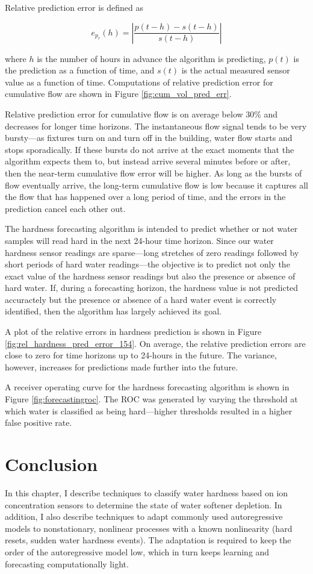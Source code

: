 Relative prediction error is defined as

\begin{equation*}
e_{p_r}(h) = \left| \frac{p(t-h)-s(t-h)}{s(t-h)} \right|
\end{equation*}

where $h$ is the number of hours in advance the algorithm is predicting, $p(t)$ is the prediction as a function of time, and $s(t)$ is the actual measured sensor value as a function of time.
 Computations of relative prediction error for cumulative flow are shown in Figure \ref{fig:cum_vol_pred_err}.

Relative prediction error for cumulative flow is on average below 30\% and decreases for longer time horizons.
 The instantaneous flow signal tends to be very bursty---as fixtures turn on and turn off in the building, water flow starts and stops sporadically.
 If these bursts do not arrive at the exact moments that the algorithm expects them to, but instead arrive several minutes before or after, then the near-term cumulative flow error will be higher.
 As long as the bursts of flow eventually arrive, the long-term cumulative flow is low because it captures all the flow that has happened over a long period of time, and the errors in the prediction cancel each other out.

The hardness forecasting algorithm is intended to predict whether or not water samples will read hard in the next 24-hour time horizon.
 Since our water hardness sensor readings are sparse---long stretches of zero readings followed by short periods of hard water readings---the objective is to predict not only the exact value of the hardness sensor readings but also the presence or absence of hard water.
 If, during a forecasting horizon, the hardness value is not predicted accuractely but the presence or absence of a hard water event is correctly identified, then the algorithm has largely achieved its goal.

A plot of the relative errors in hardness prediction is shown in Figure \ref{fig:rel_hardness_pred_error_154}.
 On average, the relative prediction errors are close to zero for time horizons up to 24-hours in the future.
 The variance, however, increases for predictions made further into the future.


A receiver operating curve for the hardness forecasting algorithm is shown in Figure \ref{fig:forecastingroc}.
 The ROC was generated by varying the threshold at which water is classified as being hard---higher thresholds resulted in a higher false positive rate.


\section{Conclusion}


In this chapter, I describe techniques to classify water hardness based on ion concentration sensors to determine the state of water softener depletion.
 In addition, I also describe techniques to adapt commonly used autoregressive models to nonstationary, nonlinear processes with a known nonlinearity (hard resets, sudden water hardness events).
 The adaptation is required to keep the order of the autoregressive model low, which in turn keeps learning and forecasting computationally light.
